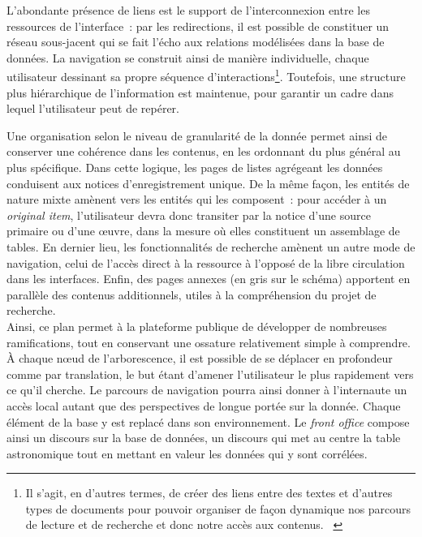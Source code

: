 \documentclass[a4paper,12pt,twoside]{book}
\newcommand{\eng}{\emph}
\newcommand{\oi}{\eng{original item}\xspace}
\newcommand{\bdd}{base de données\xspace}
\newcommand{\g}[1]{\og#1~\fg}
\begin{document}
L'abondante présence de liens est le support de l'interconnexion entre les ressources de l'interface~: par les redirections, il est possible de constituer un réseau sous-jacent qui se fait l'écho aux relations modélisées dans la \bdd. La navigation se construit ainsi de manière individuelle, chaque utilisateur dessinant sa propre séquence d'interactions\footnote{\g{Il s’agit, en d’autres termes, de créer des liens entre des textes et d’autres types de documents pour pouvoir organiser de façon dynamique nos parcours de lecture et de recherche et donc notre accès aux contenus.} \cite[§~6]{sinatraChapitreHistoireHumanites2014}}. Toutefois, une structure plus hiérarchique de l'information est maintenue, pour garantir un cadre dans lequel l'utilisateur peut de repérer.

Une organisation selon le niveau de granularité de la donnée permet ainsi de conserver une cohérence dans les contenus, en les ordonnant du plus général au plus spécifique. Dans cette logique, les pages de listes agrégeant les données conduisent aux notices d'enregistrement unique. De la même façon, les entités de nature mixte amènent vers les entités qui les composent~: pour accéder à un \oi, l'utilisateur devra donc transiter par la notice d'une source primaire ou d'une œuvre, dans la mesure où elles constituent un assemblage de tables. En dernier lieu, les fonctionnalités de recherche amènent un autre mode de navigation, celui de l'accès direct à la ressource à l'opposé de la libre circulation dans les interfaces. Enfin, des pages annexes (en gris sur le schéma) apportent en parallèle des contenus additionnels, utiles à la compréhension du projet de recherche.\\

Ainsi, ce plan permet à la plateforme publique de développer de nombreuses ramifications, tout en conservant une ossature relativement simple à comprendre. À chaque nœud de l'arborescence, il est possible de se déplacer en profondeur comme par translation, le but étant d'amener l'utilisateur le plus rapidement vers ce qu'il cherche. Le parcours de navigation pourra ainsi donner à l'internaute un accès local autant que des perspectives de longue portée sur la donnée. Chaque élément de la base y est replacé dans son environnement. Le \eng{front office} compose ainsi un discours sur la \bdd, un discours qui met au centre la table astronomique tout en mettant en valeur les données qui y sont corrélées.\\
\end{document}
